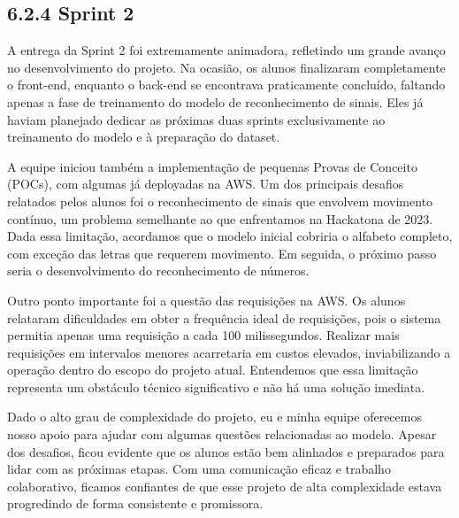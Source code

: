 \hypertarget{__RefHeading___Toc4470_31181766333}{}

\subsection*{6.2.4 Sprint 2}
\label{cliente-hoortech:text-h-0033}

A entrega da Sprint 2 foi extremamente animadora, refletindo um grande avanço no desenvolvimento do projeto. Na ocasião, os alunos finalizaram completamente o front-end, enquanto o back-end se encontrava praticamente concluído, faltando apenas a fase de treinamento do modelo de reconhecimento de sinais. Eles já haviam planejado dedicar as próximas duas sprints exclusivamente ao treinamento do modelo e à preparação do dataset.\par

A equipe iniciou também a implementação de pequenas Provas de Conceito (POCs), com algumas já deployadas na AWS. Um dos principais desafios relatados pelos alunos foi o reconhecimento de sinais que envolvem movimento contínuo, um problema semelhante ao que enfrentamos na Hackatona de 2023. Dada essa limitação, acordamos que o modelo inicial cobriria o alfabeto completo, com exceção das letras que requerem movimento. Em seguida, o próximo passo seria o desenvolvimento do reconhecimento de números.\par

Outro ponto importante foi a questão das requisições na AWS. Os alunos relataram dificuldades em obter a frequência ideal de requisições, pois o sistema permitia apenas uma requisição a cada 100 milissegundos. Realizar mais requisições em intervalos menores acarretaria em custos elevados, inviabilizando a operação dentro do escopo do projeto atual. Entendemos que essa limitação representa um obstáculo técnico significativo e não há uma solução imediata.\par

Dado o alto grau de complexidade do projeto, eu e minha equipe oferecemos nosso apoio para ajudar com algumas questões relacionadas ao modelo. Apesar dos desafios, ficou evidente que os alunos estão bem alinhados e preparados para lidar com as próximas etapas. Com uma comunicação eficaz e trabalho colaborativo, ficamos confiantes de que esse projeto de alta complexidade estava progredindo de forma consistente e promissora.\par

